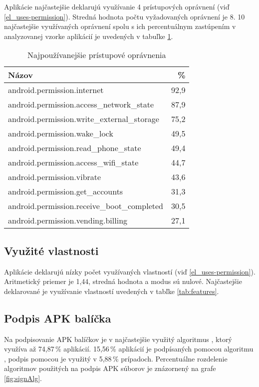 Aplikácie najčastejšie deklarujú využívanie 4 prístupových oprávnení (viď \ref{el_uses-permission}). Stredná hodnota počtu vyžadovaných oprávnení je 8. 10 najčastejšie využívaných oprávnení spolu s ich percentuálnym zastúpením v analyzovanej vzorke aplikácií je uvedených v tabuľke \ref{tab:permissions}. 
\begin{table}[!htbp]
\centering
  \begin{tabular}{|l r|}
    \hline
    Názov & \% \\\hline\hline
    android.permission.internet & 92,9 \\
    android.permission.access\_network\_state & 87,9 \\
    android.permission.write\_external\_storage & 75,2 \\
    android.permission.wake\_lock & 49,5 \\
    android.permission.read\_phone\_state & 49,4 \\
    android.permission.access\_wifi\_state & 44,7 \\
    android.permission.vibrate & 43,6 \\
    android.permission.get\_accounts & 31,3 \\
    android.permission.receive\_boot\_completed & 30,5 \\
    android.permission.vending.billing & 27,1 \\
    \hline
  \end{tabular}
  \caption{Najpoužívanejšie prístupové oprávnenia}
  \label{tab:permissions}
\end{table}

\subsection*{Využité vlastnosti}
Aplikácie deklarujú nízky počet využívaných vlastností (viď \ref{el_uses-permission}). Aritmetický priemer je 1,44, stredná hodnota a modus sú nulové. Najčastejšie deklarované je využívanie vlastností uvedených v tabľke \ref{tab:features}.

\subsection*{Podpis APK balíčka}
Na podpisovanie APK balíčkov je v najčastejšie využitý algoritmus , ktorý využíva až 74,87\,\% aplikácií. 15,56\,\% aplikácií je podpísaných pomocou algoritmu , podpis pomocou  je využitý v 5,88\,\% prípadoch. Percentuálne rozdelenie algoritmov použitých na podpis APK súborov je znázornený na grafe \ref{fig:signAlg}.


